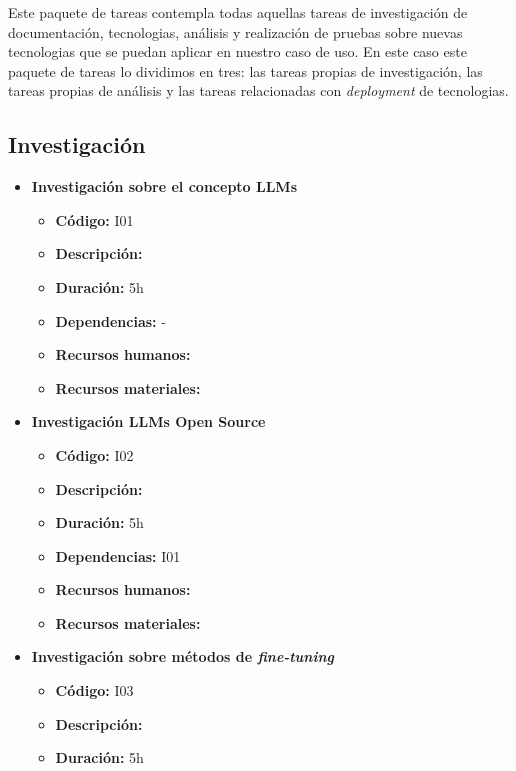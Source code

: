 Este paquete de tareas contempla todas aquellas tareas de investigación de documentación, tecnologias, análisis y realización de pruebas sobre nuevas tecnologias
que se puedan aplicar en nuestro caso de uso. En este caso este paquete de tareas lo dividimos en tres: las tareas propias de investigación, las tareas propias de 
análisis y las tareas relacionadas con \textit{deployment} de tecnologias.

\subsection{Investigación}
\label{subsec:tareas_investigacion}

\begin{itemize}
    \item \textbf{Investigación sobre el concepto LLMs}
        \begin{itemize}
            \item \textbf{Código:} I01
            \item \textbf{Descripción:}
            \item \textbf{Duración:} 5h
            \item \textbf{Dependencias:} -
            \item \textbf{Recursos humanos:}
            \item \textbf{Recursos materiales:}
        \end{itemize}
    \item \textbf{Investigación LLMs Open Source}
        \begin{itemize}
            \item \textbf{Código:} I02
            \item \textbf{Descripción:}
            \item \textbf{Duración:} 5h
            \item \textbf{Dependencias:} I01
            \item \textbf{Recursos humanos:}
            \item \textbf{Recursos materiales:}
        \end{itemize}
    \item \textbf{Investigación sobre métodos de \textit{fine-tuning}}
        \begin{itemize}
            \item \textbf{Código:} I03
            \item \textbf{Descripción:}
            \item \textbf{Duración:} 5h

\end{itemize}
\end{itemize}
